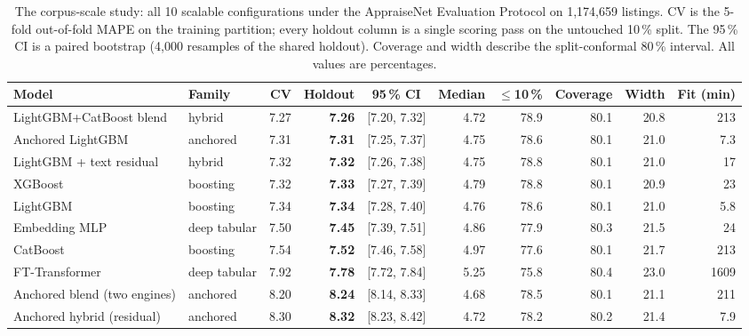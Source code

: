 \begin{table}[t]
\centering
\caption{The corpus-scale study: all 10 scalable configurations under the AppraiseNet Evaluation Protocol on 1{,}174{,}659 listings. CV is the 5-fold out-of-fold MAPE on the training partition; every holdout column is a single scoring pass on the untouched 10\,\% split. The 95\,\% CI is a paired bootstrap (4{,}000 resamples of the shared holdout). Coverage and width describe the split-conformal 80\,\% interval. All values are percentages.}
\label{tab:results}
\footnotesize\setlength{\tabcolsep}{5pt}
\begin{tabular}{llrrcrrrrr}
\toprule
Model & Family & CV & Holdout & 95\,\% CI & Median & $\le$10\,\% & Coverage & Width & Fit (min) \\
\midrule
LightGBM+CatBoost blend & hybrid & 7.27 & \textbf{7.26} & [7.20, 7.32] & 4.72 & 78.9 & 80.1 & 20.8 & 213 \\
Anchored LightGBM & anchored & 7.31 & \textbf{7.31} & [7.25, 7.37] & 4.75 & 78.6 & 80.1 & 21.0 & 7.3 \\
LightGBM + text residual & hybrid & 7.32 & \textbf{7.32} & [7.26, 7.38] & 4.75 & 78.8 & 80.1 & 21.0 & 17 \\
XGBoost & boosting & 7.32 & \textbf{7.33} & [7.27, 7.39] & 4.79 & 78.8 & 80.1 & 20.9 & 23 \\
LightGBM & boosting & 7.34 & \textbf{7.34} & [7.28, 7.40] & 4.76 & 78.6 & 80.1 & 21.0 & 5.8 \\
Embedding MLP & deep tabular & 7.50 & \textbf{7.45} & [7.39, 7.51] & 4.86 & 77.9 & 80.3 & 21.5 & 24 \\
CatBoost & boosting & 7.54 & \textbf{7.52} & [7.46, 7.58] & 4.97 & 77.6 & 80.1 & 21.7 & 213 \\
FT-Transformer & deep tabular & 7.92 & \textbf{7.78} & [7.72, 7.84] & 5.25 & 75.8 & 80.4 & 23.0 & 1609 \\
Anchored blend (two engines) & anchored & 8.20 & \textbf{8.24} & [8.14, 8.33] & 4.68 & 78.5 & 80.1 & 21.1 & 211 \\
Anchored hybrid (residual) & anchored & 8.30 & \textbf{8.32} & [8.23, 8.42] & 4.72 & 78.2 & 80.2 & 21.4 & 7.9 \\
\bottomrule
\end{tabular}
\end{table}
